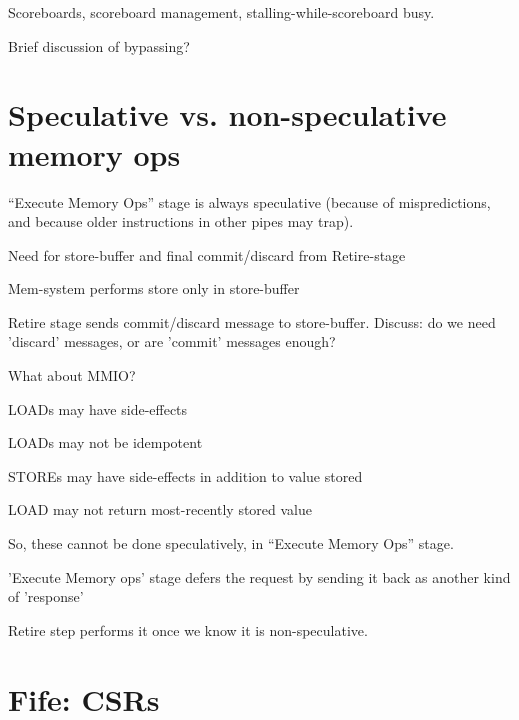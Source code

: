 Scoreboards, scoreboard management, stalling-while-scoreboard busy.

Brief discussion of bypassing?


\section{Speculative vs. non-speculative memory ops}

``Execute Memory Ops'' stage is always speculative (because of
mispredictions, and because older instructions in other pipes may
trap).

\begin{tightlist}
  \item Need for store-buffer and final commit/discard from Retire-stage
  \item Mem-system performs store only in store-buffer
  \item Retire stage sends commit/discard message to store-buffer.
        Discuss: do we need 'discard' messages, or are 'commit' messages enough?
\end{tightlist}

What about MMIO?

\begin{tightlist}
  \item LOADs may have side-effects
  \item LOADs may not be idempotent
  \item STOREs may have side-effects in addition to value stored
  \item LOAD may not return most-recently stored value
\end{tightlist}

So, these cannot be done speculatively, {\ie} in ``Execute Memory
Ops'' stage.

\begin{tightlist}

  \item 'Execute Memory ops' stage defers the request by sending it
    back as another kind of 'response'

  \item Retire step performs it once we know it is non-speculative.
\end{tightlist}


\section{Fife: CSRs}

